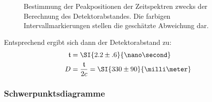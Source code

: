 \documentclass[slug=PET, room=Andreas-Schubert-Bau\,\ 424A, supervisor=Carsten\ Bittrich, coursedate=10.\ 01.\ 2020]{../../Lab_Report_LaTeX/lab_report}
\begin{document}
\begin{figure}[htb]\centering
  
  \caption[Abstandsbestimmung]{Bestimmung der Peakpositionen der Zeitspektren zwecks der
    Berechnung des Detektorabstandes. Die farbigen Intervallmarkierungen
    stellen die gesch\"atzte Abweichung dar.}
  \label{fig:calibration-lenght_det}
\end{figure}

Entsprechend ergibt sich dann der Detektorabstand zu:
\begin{align}
  \label{eq:abst}
  \mathfrak{t} &= \SI{2.2\pm .6}{\nano\second} \\
  D &= \frac{\mathfrak{t}}{2c} = \SI{330\pm 90}{\milli\meter}
\end{align}

\subsubsection{Schwerpunktsdiagramme}
\label{sec:schwpkt}
\end{document}
